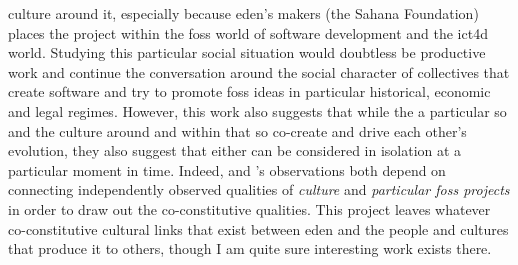 \documentclass[a4paper,man,natbib]{apa6}
\begin{document}
culture around it, especially because \acrshort{eden}'s makers (the Sahana Foundation) places the project within the \acrshort{foss} world of software development and the \acrfull{ict4d} world. Studying this particular social situation would doubtless be productive work and continue the conversation around the social character of collectives that create software and try to promote \acrshort{foss} ideas in particular historical, economic and legal regimes. However, this work also suggests that while the a particular \gls{so} and the culture around and within that \gls{so} co-create and drive each other's evolution, they also suggest that either can be considered in isolation at a particular moment in time. Indeed, \citet{Kelty2008-jm} and \citet{Gabriella_Coleman2012-lq}'s observations both depend on connecting independently observed qualities of \textit{culture} and \textit{particular \acrshort{foss} projects} in order to draw out the co-constitutive qualities. This project leaves whatever co-constitutive cultural links that exist between \acrshort{eden} and the people and cultures that produce it to others, though I am quite sure interesting work exists there.

\end{document}
